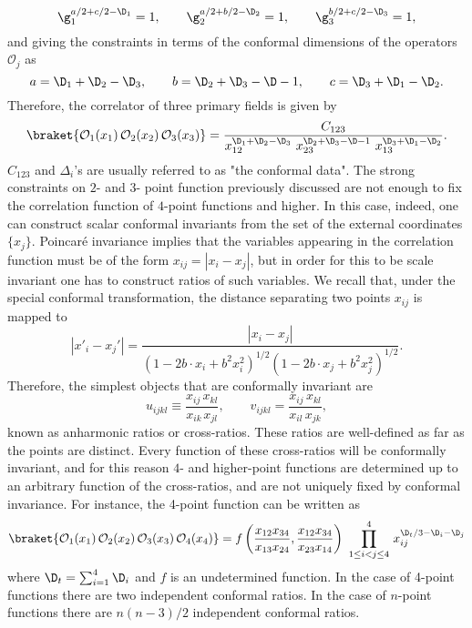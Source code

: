 \documentclass[a4paper,11pt,openright,twoside]{book}
\newcommand{\mO}{\mathcal{O}}
\numberwithin{equation}{section}
\begin{document}
\begin{equation}
	\g_1^{a/2+c/2-\D_1}=1,\qquad\g_2^{a/2+b/2-\D_2}=1,\qquad\g_3^{b/2+c/2-\D_3}=1,
\end{equation}
and giving the constraints in terms of the conformal dimensions of the operators $\mO_j$ as
\begin{equation}
	a=\D_1+\D_2-\D_3,\qquad b=\D_2+\D_3-\D-1,\qquad c=\D_3+\D_1-\D_2.
\end{equation}
Therefore, the correlator of three primary fields is given by
\begin{equation}
	\braket{\mO_1(x_1)\,\mO_2(x_2)\,\mO_3(x_3)}=\frac{C_{123}}{x_{12}^{\D_1+\D_2-\D_3}\ x_{23}^{\D_2+\D_3-\D-1}\ x_{13}^{\D_3+\D_1-\D_2}}.
\end{equation}
$C_{123}$ and $\Delta_i$'s are usually referred to as "the conformal data". The strong constraints on $2$- and $3$- point function previously discussed are not enough to fix the correlation function of $4$-point functions and higher. In this case, indeed, one can construct scalar conformal invariants from the set of the external coordinates $\{x_j\}$.  Poincar\'e invariance implies that the variables appearing in the correlation function must be of the form $x_{ij}=|x_i-x_j|$, but in order for this to be scale invariant one has to construct ratios of such variables. We recall that, under the special conformal transformation, the distance separating two points $x_{i j}$ is mapped to
\begin{equation}
	|x'_i-x_j'|=\frac{|x_i-x_j|}{(1-2b\cdot x_i+b^2x_i^2)^{1/2}(1-2b\cdot x_j+b^2x_j^2)^{1/2}}.
\end{equation}
Therefore, the simplest objects that are conformally invariant are
\begin{equation}
	u_{ijkl}\equiv\frac{x_{ij}\,x_{kl}}{x_{ik\,}x_{jl}},\qquad v_{ijkl}=\frac{x_{ij}\,x_{kl}}{x_{il}\,x_{jk}},
\end{equation}
known as {anharmonic ratios} or {cross-ratios}. These ratios are well-defined as far as the points are distinct. Every function of these cross-ratios will be conformally invariant, and for this reason $4$- and higher-point functions are determined up to an arbitrary function of the cross-ratios, and are not uniquely fixed by conformal invariance. 
For instance, the 4-point function can be written as
\begin{equation}
	\braket{\mO_1(x_1)\,\mO_2(x_2)\,\mO_3(x_3)\,\mO_4(x_4)}=f\left(\frac{x_{12}x_{34}}{x_{13}x_{24}},\frac{x_{12}x_{34}}{x_{23}x_{14}}\right)\ \prod_{1\le i<j\le 4}^{4}\,x_{ij}^{\D_t/3-\D_i-\D_j}
\end{equation}
where $\D_t=\sum_{i=1}^4\D_i$ and $f$ is an undetermined function. In the case of 4-point functions there are two independent conformal ratios. In the case of $n$-point functions there are $n(n-3)/2$ independent conformal ratios. 
\end{document}
